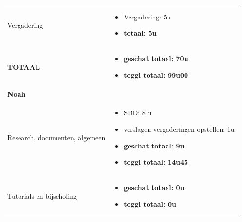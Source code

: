 \documentclass{article}
\begin{document}
\begin{center}
\begin{tabularx}{\textwidth}[t]{XX}
\arrayrulecolor{black}\hline

\vspace{2 mm}
Vergadering & 
\begin{minipage}[t]{\linewidth}%
\vspace{2 mm}
\begin{itemize}
\item Vergadering: 5u
\item \textbf{totaal: 5u}
\vspace{2 mm}
\end{itemize} 
\end{minipage}\\

\arrayrulecolor{black}\hline

\vspace{2 mm}
\textbf{TOTAAL} & 
\begin{minipage}[t]{\linewidth}%
\vspace{2 mm}
\begin{itemize}
\item \textbf{geschat totaal: 70u}
\item \textbf{toggl totaal: 99u00}
\vspace{2 mm}
\end{itemize} 
\end{minipage}\\



\arrayrulecolor{green}\hline
\vspace{.1 mm}
\textbf{\textcolor{myGreen}{\large{Noah}}} \vspace{.1 mm} & \\
\hline
\vspace{1 mm}
Research, documenten, algemeen & 
\begin{minipage}[t]{\linewidth}%
\vspace{1 mm}
\begin{itemize}
\item SDD: 8 u
\item verslagen vergaderingen opstellen: 1u 
\item \textbf{geschat totaal: 9u}
\item \textbf{toggl totaal: 14u45}
\end{itemize} 
\vspace{1 mm}
\end{minipage}\\

\arrayrulecolor{black}\hline

\vspace{1 mm}
Tutorials en bijscholing & 
\begin{minipage}[t]{\linewidth}%
\vspace{1 mm}
\begin{itemize}
\item \textbf{geschat totaal: 0u}
\item \textbf{toggl totaal: 0u}
\end{itemize} 
\vspace{1 mm}
\end{minipage}\\


\end{tabularx}
\end{center}
\end{document}
